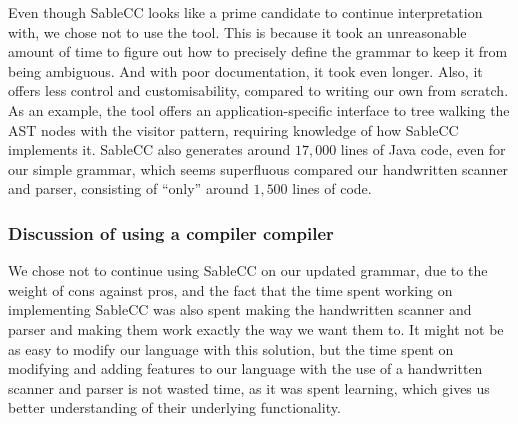 Even though SableCC looks like a prime candidate to continue
interpretation with, we chose not to use the tool. This is because it
took an unreasonable amount of time to figure out how to precisely
define the grammar to keep it from being ambiguous. And with poor
documentation, it took even longer. Also, it offers less control and
customisability, compared to writing our own from scratch. As an
example, the tool offers an application-specific interface to tree
walking the AST nodes with the visitor pattern, requiring knowledge of
how SableCC implements it. SableCC also generates around $17,000$ lines
of Java code, even for our simple grammar, which seems superfluous
compared our handwritten scanner and parser, consisting of ``only''
around $1,500$ lines of code.

\subsubsection{Discussion of using a compiler compiler}
We chose not to continue using SableCC on our updated grammar, due
to the weight of cons against pros, and the fact that the time spent
working on implementing SableCC was also spent making the handwritten
scanner and parser and making them work exactly the way we want them to.
It might not be as easy to modify our language with this solution, but
the time spent on modifying and adding features to our language with the
use of a handwritten scanner and parser is not wasted time, as it was
spent learning, which gives us better understanding of their underlying
functionality.
